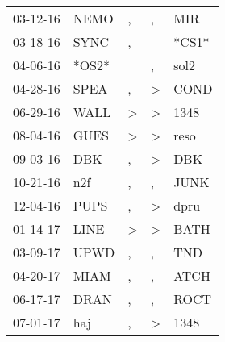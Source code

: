 \begin{supertabular}{p{0.07\textwidth}p{0.06\textwidth}p{0.02\textwidth}p{0.02\textwidth}p{0.06\textwidth}}
          03-12-16\textsuperscript{} &           NEMO\textsuperscript{} &                , &                , &            MIR\textsuperscript{} \\
          03-18-16\textsuperscript{} &           SYNC\textsuperscript{} &                , &                  &                            *CS1* \\
          04-06-16\textsuperscript{} &                            *OS2* &                  &                , &           sol2\textsuperscript{} \\
          04-28-16\textsuperscript{} &           SPEA\textsuperscript{} &                , &     \textgreater &           COND\textsuperscript{} \\
          06-29-16\textsuperscript{} &           WALL\textsuperscript{} &     \textgreater &     \textgreater &           1348\textsuperscript{} \\
          08-04-16\textsuperscript{} &           GUES\textsuperscript{} &     \textgreater &     \textgreater &           reso\textsuperscript{} \\
          09-03-16\textsuperscript{} &            DBK\textsuperscript{} &                , &     \textgreater &            DBK\textsuperscript{} \\
          10-21-16\textsuperscript{} &            n2f\textsuperscript{} &                , &                , &           JUNK\textsuperscript{} \\
          12-04-16\textsuperscript{} &           PUPS\textsuperscript{} &                , &     \textgreater &           dpru\textsuperscript{} \\
          01-14-17\textsuperscript{} &           LINE\textsuperscript{} &     \textgreater &     \textgreater &           BATH\textsuperscript{} \\
          03-09-17\textsuperscript{} &           UPWD\textsuperscript{} &                , &                , &            TND\textsuperscript{} \\
          04-20-17\textsuperscript{} &           MIAM\textsuperscript{} &                , &                , &           ATCH\textsuperscript{} \\
          06-17-17\textsuperscript{} &           DRAN\textsuperscript{} &                , &                , &           ROCT\textsuperscript{} \\
          07-01-17\textsuperscript{} &            haj\textsuperscript{} &                , &     \textgreater &           1348\textsuperscript{} \\

\end{supertabular}
